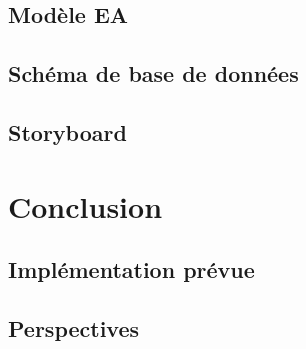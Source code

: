\documentclass[a4paper,12pt]{book}
\theoremstyle{break}
\theoremstyle{break}
\theoremstyle{definition}
\theoremstyle{remark}
\begin{document}
\section{Modèle EA}

\section{Schéma de base de données}

\section{Storyboard}

\chapter{Conclusion}
\section{Implémentation prévue}

\section{Perspectives}



\end{document}

